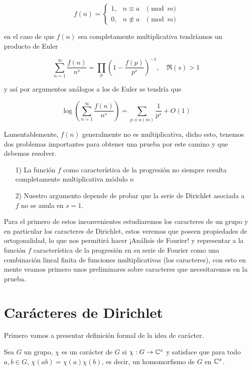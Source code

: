 $$
f(n)=\left\{\begin{array}{lll}
1, & n \equiv a & \pmod{m} \\
0, & n \not \equiv a & \pmod{m}
\end{array}\right.
$$

en el caso de que $f(n)$ sea completamente multiplicativa tendríamos un producto de Euler

$$
\sum_{n=1}^{\infty} \frac{f(n)}{n^s}=\prod_p\left(1-\frac{f(p)}{p^s}\right)^{-1}, \quad \Re(s)>1
$$

y así por argumentos análogos a los de Euler se tendría que

$$\log \left(\sum_{n=1}^{\infty} \frac{f(n)}{n^s}\right)=\sum_{p \equiv a(m)} \frac{1}{p^s}+O(1)$$

Lamentablemente, $f(n)$ generalmente no es multiplicativa, dicho esto, tenemos dos problemas importantes para obtener una prueba por este camino y que debemos resolver.

\begin{itemize}
\item[1)] La función $f$ como característica de la progresión no siempre resulta completamente multiplicativa módulo $n$
\item[2)] Nuestro argumento depende de  probar que la serie de Dirichlet asociada a $f$ no se anula en $s=1$.
\end{itemize}

Para el primero de estos inconvenientes estudiaremos los caracteres de un grupo y en particular los caracteres de Dirichlet, estos veremos que poseen propiedades de ortogonalidad, lo que nos permitirá hacer ¡Análisis de Fourier! y representar a la función $f$ característica de la progresión en su serie de Fourier como una combinación lineal finita de funciones multiplicativas (los caracteres), con esto en mente veamos primero unos preliminares sobre caracteres que necesitaremos en la prueba.

\section{Carácteres de Dirichlet}

Primero vamos a presentar definición formal de la idea de carácter.\\

\begin{definition}
Sea $G$ un grupo, $\chi$ es un carácter de $G$ si $\chi: G\to \mathbb{C}^{x}$ y satisface que para todo $a,b\in G$, $\chi(ab)=\chi(a)\chi(b)$, es decir, un homomorfismo de $G$ en $\mathbb{C}^{x}$.
\end{definition}

